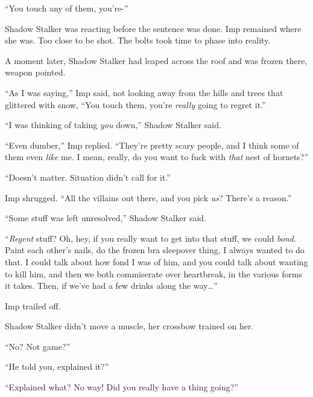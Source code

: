 ``You touch any of them, you're-''



Shadow Stalker was reacting before the sentence was done.  Imp remained where she was.  Too close to be shot.  The bolts took time to phase into reality.



A moment later, Shadow Stalker had leaped across the roof and was frozen there, weapon pointed.



``As I was saying,'' Imp said, not looking away from the hills and trees that glittered with snow, ``You touch them, you're \emph{really} going to regret it.''



``I was thinking of taking \emph{you} down,'' Shadow Stalker said.



``Even dumber,'' Imp replied.  ``They're pretty scary people, and I think some of them even \emph{like} me.  I mean, really, do you want to fuck with \emph{that} nest of hornets?''



``Doesn't matter.  Situation didn't call for it.''



Imp shrugged.  ``All the villains out there, and you pick \emph{us}?  There's a reason.''



``Some stuff was left unresolved,'' Shadow Stalker said.



``\emph{Regent} stuff?  Oh, hey, if you really want to get into that stuff, we could \emph{bond}.  Paint each other's nails, do the frozen bra sleepover thing, I always wanted to do that.  I could talk about how fond I was of him, and you could talk about wanting to kill him, and then we both commiserate over heartbreak, in the various forms it takes.  Then, if we've had a few drinks along the way\ldots''



Imp trailed off.



Shadow Stalker didn't move a muscle, her crossbow trained on her.



``No?  Not game?''



``He told you, explained it?''



``Explained what?  No way!  Did you really have a thing going?''



